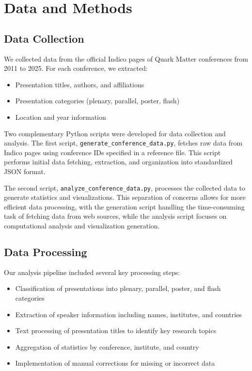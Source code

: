 \documentclass[a4paper,11pt]{article}
\begin{document}
\section{Data and Methods}

\subsection{Data Collection}

We collected data from the official Indico pages of Quark Matter conferences from 2011 to 2025. For each conference, we extracted:
\begin{itemize}
    \item Presentation titles, authors, and affiliations
    \item Presentation categories (plenary, parallel, poster, flash)
    \item Location and year information
\end{itemize}

Two complementary Python scripts were developed for data collection and analysis. The first script, \texttt{generate\_conference\_data.py}, fetches raw data from Indico pages using conference IDs specified in a reference file. This script performs initial data fetching, extraction, and organization into standardized JSON format.

The second script, \texttt{analyze\_conference\_data.py}, processes the collected data to generate statistics and visualizations. This separation of concerns allows for more efficient data processing, with the generation script handling the time-consuming task of fetching data from web sources, while the analysis script focuses on computational analysis and visualization generation.

\subsection{Data Processing}

Our analysis pipeline included several key processing steps:
\begin{itemize}
    \item Classification of presentations into plenary, parallel, poster, and flash categories
    \item Extraction of speaker information including names, institutes, and countries
    \item Text processing of presentation titles to identify key research topics
    \item Aggregation of statistics by conference, institute, and country
    \item Implementation of manual corrections for missing or incorrect data
\end{itemize}
\end{document}
